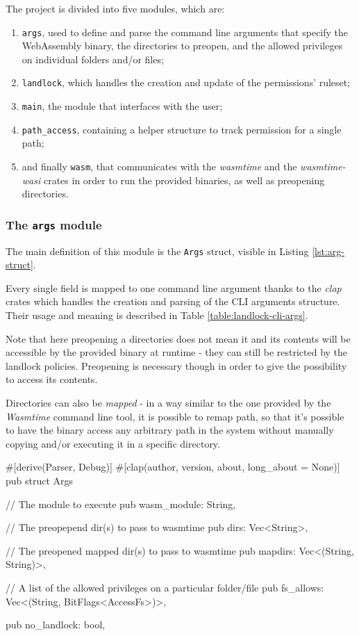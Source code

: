 The project is divided into five modules, which are:
\begin{enumerate}
  \item \texttt{args}, used to define and parse the command line arguments that specify the WebAssembly binary,
        the directories to preopen, and the allowed privileges on individual folders and/or files;
  \item \texttt{landlock}, which handles the creation and update of the permissions' ruleset;
  \item \texttt{main}, the module that interfaces with the user;
  \item \texttt{path\_access}, containing a helper structure to track permission for a single path;
  \item and finally \texttt{wasm}, that communicates with the \textit{wasmtime} and the \textit{wasmtime-wasi} crates
        in order to run the provided binaries, as well as preopening directories.
\end{enumerate}

\subsubsection{The \texttt{args} module}

The main definition of this module is the \texttt{Args} struct, visible in Listing \ref{lst:arg-struct}.

Every single field is mapped to one command line argument thanks to the \textit{clap} crates which handles the
creation and parsing of the CLI arguments structure.
Their usage and meaning is described in Table \ref{table:landlock-cli-args}.

Note that here preopening a directories does not mean it and its contents will be accessible by the
provided binary at runtime - they can still be restricted by the landlock policies. Preopening is
necessary though in order to give the possibility to access its contents.

Directories can also be \textit{mapped} - in a way similar to the one provided by the \textit{Wasmtime} command line tool,
it is possible to remap path, so that it's possible to have the binary access any arbitrary path in the system
without manually copying and/or executing it in a specific directory.

\begin{code}[language=rust, caption=The \texttt{Args} struct, label=lst:arg-struct]
  #[derive(Parser, Debug)]
  #[clap(author, version, about, long_about = None)]
  pub struct Args {
    // The module to execute
    pub wasm_module: String,

    // The preopepend dir(s) to pass to wasmtime
    pub dirs: Vec<String>,

    // The preopened mapped dir(s) to pass to wasmtime
    pub mapdirs: Vec<(String, String)>,

    // A list of the allowed privileges on a particular folder/file
    pub fs_allows: Vec<(String, BitFlags<AccessFs>)>,

    pub no_landlock: bool,
  }
\end{code}

